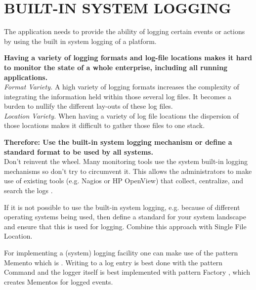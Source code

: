 \newpage
\section*{BUILT-IN SYSTEM LOGGING}

The application needs to provide the ability of logging certain events or actions by using the built in system logging of a platform. 

\begin{center}
  
\end{center}

\textbf{Having a variety of logging formats and log-file locations makes it hard to monitor the state of a whole enterprise, including all running applications.}\\

\textit{Format Variety.} A high variety of logging formats increases the complexity of integrating the information held within those several log files. It becomes a burden to nullify the different lay-outs of these log files.\\ 

\textit{Location Variety.} When having a variety of log file locations the dispersion of those locations makes it difficult to gather those files to one stack.

\begin{center}
   
\end{center}

\textbf{Therefore: Use the built-in system logging mechanism or define a standard format to be used by all systems.}\\

Don't reinvent the wheel. Many monitoring tools use the system built-in logging mechanisms so don't try to circumvent it. This allows the administrators to make use of existing tools (e.g. Nagios or HP OpenView) that collect, centralize, and search the logs \cite{Limoncelli2011a}.

If it is not possible to use the built-in system logging, e.g. because of different operating systems being used, then define a standard for your system landscape and ensure that this is used for logging. Combine this approach with {\sc Single File Location}.

For implementing a (system) logging facility one can make use of the  pattern {\sc Memento} \cite{Gamma95} which is . Writing to a log entry is best done with the pattern {\sc Command} \cite{Gamma95} and the logger itself is best implemented with pattern {\sc Factory} \cite{Gamma95}, which creates Mementos for logged events.

